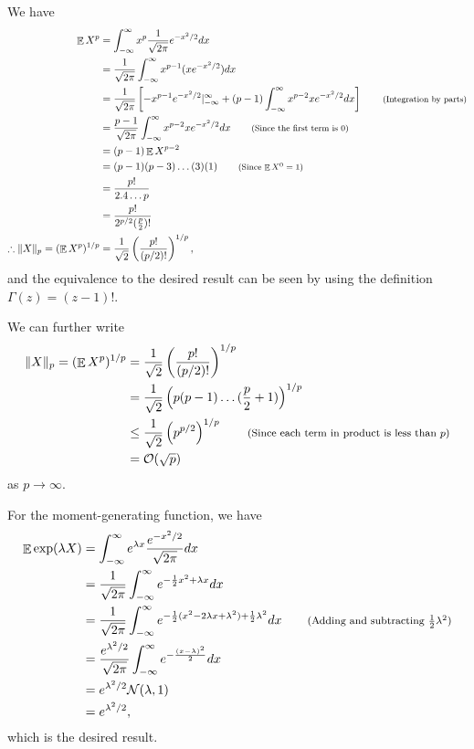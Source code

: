 \documentclass[11pt]{article}
\newenvironment{solution}[1][Solution]{\begin{trivlist}
\item[\hskip \labelsep {\bfseries #1}\hskip \labelsep]}{\end{trivlist}}
\DeclareMathOperator*{\E}{\mathbb{E}}
\newcommand*{\annot}[1]{\tag*{\footnotesize{(#1)}}}
\begin{document}
\begin{solution}
We have
\begin{align*}
\E X^p &= \int_{-\infty}^{\infty}x^p \frac{1}{\sqrt{2\pi}}e^{-x^2/2}dx \\
	&= \frac{1}{\sqrt{2\pi}}\int_{-\infty}^{\infty}x^{p-1} (xe^{-x^2/2})dx \\
	&= \frac{1}{\sqrt{2\pi}}\left[ -x^{p-1}e^{-x^2/2}|_{-\infty}^{\infty} + (p-1)\int_{-\infty}^{\infty}x^{p-2}xe^{-x^2/2}dx \right] \annot{Integration by parts} \\
	&= \frac{p-1}{\sqrt{2\pi}} \int_{-\infty}^{\infty}x^{p-2}xe^{-x^2/2}dx \annot{Since the first term is 0} \\
	&= (p-1)\E X^{p-2} \\
	&= (p-1)(p-3)\ldots(3)(1) \annot{Since $\E X^0 = 1$} \\
	&= \frac{p!}{2.4\ldots p} \\
	&= \frac{p!}{2^{p/2}(\frac{p}{2})!} \\
\therefore \lVert X \rVert_p = (\E X^p)^{1/p} &= \frac{1}{\sqrt{2}}\left(\frac{p!}{(p/2)!} \right)^{1/p}, \\
\end{align*}
and the equivalence to the desired result can be seen by using the definition $\Gamma(z) = (z-1)!$.

We can further write
\begin{align*}
\lVert X \rVert_p = (\E X^p)^{1/p} &= \frac{1}{\sqrt{2}}\left(\frac{p!}{(p/2)!} \right)^{1/p} \\
		&= \frac{1}{\sqrt{2}}\left(p(p-1)\ldots(\frac{p}{2}+1) \right)^{1/p} \\
		&\leq \frac{1}{\sqrt{2}}\left(p^{p/2} \right)^{1/p} \annot{Since each term in product is less than $p$}\\
		&= \mathcal{O}(\sqrt{p})
\end{align*}
as $p \rightarrow \infty$.

For the moment-generating function, we have
\begin{align*}
\E \exp(\lambda X) &= \int_{-\infty}^{\infty}e^{\lambda x}\frac{e^{-x^2/2}}{\sqrt{2\pi}}dx \\
	&= \frac{1}{\sqrt{2\pi}}\int_{-\infty}^{\infty}e^{-\frac{1}{2}x^2 + \lambda x}dx \\
	&= \frac{1}{\sqrt{2\pi}}\int_{-\infty}^{\infty}e^{-\frac{1}{2}(x^2 - 2\lambda x + \lambda^2) + \frac{1}{2}\lambda^2}dx \annot{Adding and subtracting $\frac{1}{2}\lambda^2$} \\
	&= \frac{e^{\lambda^2/2}}{\sqrt{2\pi}}\int_{-\infty}^{\infty}e^{-\frac{(x-\lambda)^2}{2}}dx \\
	&= e^{\lambda^2/2}\mathcal{N}(\lambda,1) \\
	&= e^{\lambda^2/2},
\end{align*}
which is the desired result.
\end{solution}
\end{document}
